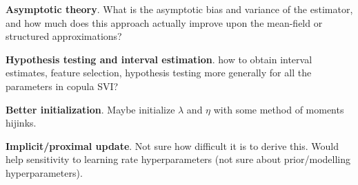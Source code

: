 \textbf{Asymptotic theory}. What is the asymptotic bias and variance of the
estimator, and how much does this approach actually improve upon the mean-field
or structured approximations?

\textbf{Hypothesis testing and interval estimation}. how to obtain
interval estimates, feature selection, hypothesis testing more generally for all
the parameters in copula SVI?

\textbf{Better initialization}.
Maybe initialize $\lambda$ and $\eta$ with some method of moments hijinks.

\textbf{Implicit/proximal update}.
Not sure how difficult it is to derive this.
Would help sensitivity to learning rate hyperparameters (not sure about
prior/modelling hyperparameters).
\fi
